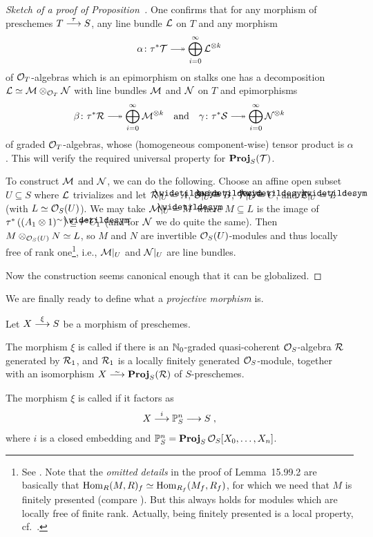 \documentclass[a4paper,parskip=half,numbers=enddot, DIV=12]{scrreprt}
\begin{document}
\begin{proof}[Sketch of a proof of Proposition~]
	One confirms that for any morphism of preschemes $T\morphism[\tau]S$, any line bundle $\mathcal{L}$ on $T$ and any morphism
	\begin{align*}
		\alpha\colon \tau^*\Tt\epimorphism\bigoplus_{i=0}^\infty\Ll^{\otimes k}
	\end{align*}
	of $\mathcal{O}_T$-algebras which is an epimorphism on stalks one has a decomposition $\mathcal{L}\simeq\mathcal{M}\otimes_{\mathcal{O}_T}\mathcal{N}$ with line bundles $\mathcal{M}$ and $\mathcal{N}$ on $T$ and epimorphisms 
	\begin{align*}
		\beta\colon \tau^*\Rr\epimorphism\bigoplus_{i=0}^{\infty}\Mm^{\otimes k}\quad\text{and}\quad\gamma\colon\tau^*\Ss\epimorphism\bigoplus_{i=0}^{\infty}\Nn^{\otimes k}
	\end{align*}
	of graded $\mathcal{O}_T$-algebras, whose (homogeneous component-wise) tensor product is $\alpha$. This will verify the required universal property for $\operatorname{\mathbf{Proj}}_S(\mathcal{T})$. 
	
	To construct $\mathcal{M}$ and $\mathcal{N}$, we can do the following. Choose an affine open subset $U\subseteq S$ where $\mathcal{L}$ trivializes and let $\Rr|_U=\snake{A}$, $\Ss|_U=\snake{B}$, $\Tt|_U=\snake{C}$, and $\Ll|_U=\snake{L}$ (with $L\simeq \mathcal{O}_S(U)$). We may take $\Mm|_U=\snake{M}$ where $M\subseteq L$ is the image of $\tau^*\left((A_1\otimes 1)^\sim\right)\subseteq \tau^*\snake{C_1}$ (and for $\mathcal{N}$ we do quite the same). Then $M\otimes_{\mathcal{O}_S(U)}N\simeq L$, so $M$ and $N$ are invertible $\mathcal{O}_S(U)$-modules and thus locally free of rank one\footnote{See \cite[]{stacks-project}. Note that the \emph{omitted details} in the proof of Lemma~15.99.2 are basically that $\operatorname{Hom}_R(M,R)_f\simeq \operatorname{Hom}_{R_f}(M_f,R_f)$, for which we need that $M$ is finitely presented (compare \cite[p.~9]{homalg}). But this always holds for modules which are locally free of finite rank. Actually, being finitely presented is a local property, cf.\ \cite[]{stacks-project}.}, i.e., $\mathcal{M}|_U$ and $\mathcal{N}|_U$ are line bundles.
	
	Now the construction seems canonical enough that it can be globalized.
\end{proof}
We are finally ready to define what a \emph{projective morphism} is.
\begin{defi}
	Let $X\morphism[\xi]S$  be a morphism of preschemes.
	\begin{alphanumerate}
		\item The morphism $\xi$ is called  if there is an $\mathbb{N}_0$-graded quasi-coherent $\mathcal{O}_S$-algebra $\mathcal{R}$ generated by $\mathcal{R}_1$, and $\mathcal{R}_1$ is a locally finitely generated $\mathcal{O}_S$-module, together with an isomorphism $X\isomorphism\PROJ_S(\Rr)$ of $S$-preschemes.
		\item The morphism $\xi$ is called  if it factors as
		\begin{align*}
			X\morphism[i]\IP_S^n\morphism S\;,
		\end{align*}
		where $i$ is a closed embedding and $\mathbb{P}_S^n=\operatorname{\mathbf{Proj}}_S\mathcal{O}_S[X_0,\ldots,X_n]$.
	\end{alphanumerate}
\end{defi}
\end{document}
